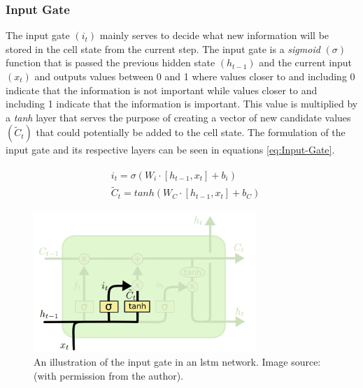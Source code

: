 \subsubsection{Input Gate}
\label{subsubsec:Background-Information:Forecasting-Models:Long-Short-Term-Memory-Networks:Input-Gate}
The input gate $(i_t)$ mainly serves to decide what new information will be stored in the cell state from the current step. The input gate is a \textit{sigmoid} $(\sigma)$ function that is passed the previous hidden state $(h_{t-1})$ and the current input $(x_t)$ and outputs values between 0 and 1 where values closer to and including 0 indicate that the information is not important while values closer to and including 1 indicate that the information is important. This value is multiplied by a \textit{tanh} layer that serves the purpose of creating a vector of new candidate values $(\tilde{C}_t)$ that could potentially be added to the cell state. The formulation of the input gate and its respective layers can be seen in equations \ref{eq:Input-Gate}.

\begin{align}
    \begin{split}
        & i_t = \sigma (W_i \cdot \left[h_{t-1}, x_t \right] + b_i) \\
        & \tilde{C}_t = tanh (W_C \cdot \left[h_{t-1}, x_t \right] + b_C)
    \end{split}
\label{eq:Input-Gate}
\end{align}

\begin{figure}[hbt!]
    \centering
    \includegraphics[width=0.75\textwidth]{Images/Chapter 3/LSTM/LSTM-Input-Gate-Illustration.png}
    \caption{An illustration of the input gate in an \gls{lstm} network. Image source: \cite{Colah} (with permission from the author).}
    \label{fig:LSTM-Input-Gate-Illustration}
\end{figure}

